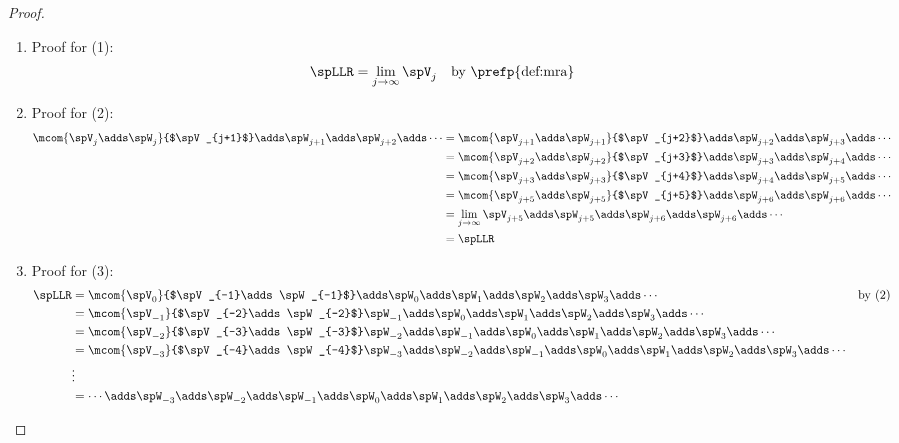 \begin{proof}
\begin{enumerate}
  \item Proof for (1):
    \begin{align*}
      \spLLR 
        &= \lim_{j\to\infty}\spV_j                 
        && \text{by \prefp{def:mra}}
    \end{align*}

  \item Proof for (2):
    \begin{align*}
      \mcom{\spV_j \adds \spW_j}{$\spV_{j+1}$} \adds \spW_{j+1} \adds \spW_{j+2} \adds \cdots
        &= \mcom{\spV_{j+1} \adds \spW_{j+1}}{$\spV_{j+2}$} \adds \spW_{j+2} \adds \spW_{j+3} \adds \cdots
      \\&= \mcom{\spV_{j+2} \adds \spW_{j+2}}{$\spV_{j+3}$} \adds \spW_{j+3} \adds \spW_{j+4} \adds \cdots
      \\&= \mcom{\spV_{j+3} \adds \spW_{j+3}}{$\spV_{j+4}$} \adds \spW_{j+4} \adds \spW_{j+5} \adds \cdots
      \\&= \mcom{\spV_{j+5} \adds \spW_{j+5}}{$\spV_{j+5}$} \adds \spW_{j+6} \adds \spW_{j+6} \adds \cdots
      \\&= \lim_{j\to\infty}\spV_{j+5} \adds \spW_{j+5} \adds \spW_{j+6} \adds \spW_{j+6} \adds \cdots
      \\&= \spLLR
    \end{align*}

  \item Proof for (3):
    \begin{align*}
      \spLLR &= \mcom{\spV_0}{$\spV_{-1}\adds\spW_{-1}$} \adds \spW_0 \adds \spW_1 \adds \spW_2 \adds \spW_3 \adds \cdots
             && \text{by (2)}
           \\&= \mcom{\spV_{-1}}{$\spV_{-2}\adds\spW_{-2}$} \spW_{-1} \adds \spW_0 \adds \spW_1 \adds \spW_2 \adds \spW_3 \adds \cdots
           \\&= \mcom{\spV_{-2}}{$\spV_{-3}\adds\spW_{-3}$} \spW_{-2} \adds \spW_{-1} \adds \spW_0 \adds \spW_1 \adds \spW_2 \adds \spW_3 \adds \cdots
           \\&= \mcom{\spV_{-3}}{$\spV_{-4}\adds\spW_{-4}$} \spW_{-3} \adds \spW_{-2} \adds \spW_{-1} \adds \spW_0 \adds \spW_1 \adds \spW_2 \adds \spW_3 \adds \cdots
           \\&\vdots
           \\&= \cdots \adds \spW_{-3} \adds \spW_{-2} \adds \spW_{-1} \adds \spW_0 \adds \spW_1 \adds \spW_2 \adds \spW_3 \adds \cdots
    \end{align*}
\end{enumerate}
\end{proof}

